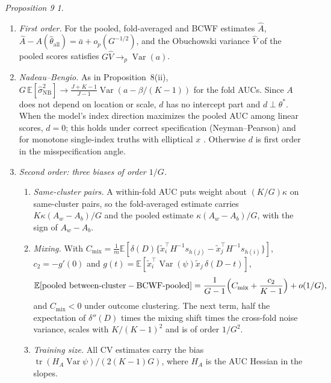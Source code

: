 \documentclass[11pt]{amsart}
\theoremstyle{plain}
\theoremstyle{definition}
\theoremstyle{remark}
\newcommand{\Var}{\operatorname{Var}}
\newcommand{\E}{\mathbb{E}}
\newcommand{\VNB}{\hat\sigma^2_{\mathrm{NB}}}
\newcommand{\fac}{\tfrac{J+K-1}{J-1}}
\newcommand{\Cmix}{C_{\mathrm{mix}}}
\newtheorem*{prop9}{Proposition 9}
\begin{document}
\begin{prop9}
\begin{enumerate}[label=(\roman*)]
\item \emph{First order.} For the pooled, fold-averaged and BCWF estimates $\hat A$, $\hat A-A(\hat\theta_{\mathrm{all}})=\bar a+o_p(G^{-1/2})$, and the Obuchowski variance $\hat V$ of the pooled scores satisfies $G\hat V\to_p\Var(a)$.
\item \emph{Nadeau--Bengio.} As in Proposition~8(ii), $G\,\E[\VNB]\to\fac\Var(a-\beta/(K-1))$ for the fold AUCs. Since $A$ does not depend on location or scale, $d$ has no intercept part and $d\perp\theta^*$. When the model's index direction maximizes the pooled AUC among linear scores, $d=0$; this holds under correct specification (Neyman--Pearson) and for monotone single-index truths with elliptical $x$ \cite{LiDuan}. Otherwise $d$ is first order in the misspecification angle.
\item \emph{Second order: three biases of order $1/G$.}
\begin{enumerate}[label=(\alph*),leftmargin=1.5em]
\item \emph{Same-cluster pairs.} A within-fold AUC puts weight about $(K/G)\kappa$ on same-cluster pairs, so the fold-averaged estimate carries $K\kappa(A_w-A_b)/G$ and the pooled estimate $\kappa(A_w-A_b)/G$, with the sign of $A_w-A_b$.
\item \emph{Mixing.} With $\Cmix=\frac1m\E[\delta(D)\{\tilde x_i^\top H^{-1}s_{h(j)}-\tilde x_j^\top H^{-1}s_{h(i)}\}]$, $c_2=-g'(0)$ and $g(t)=\E[\tilde x_i^\top\Var(\psi)\tilde x_j\,\delta(D-t)]$,
\[
\E[\text{pooled between-cluster}-\text{BCWF-pooled}]=\frac1{G-1}\Bigl(\Cmix+\frac{c_2}{K-1}\Bigr)+o(1/G),
\]
and $\Cmix<0$ under outcome clustering. The next term, half the expectation of $\delta''(D)$ times the mixing shift times the cross-fold noise variance, scales with $K/(K-1)^2$ and is of order $1/G^2$.
\item \emph{Training size.} All CV estimates carry the bias $\operatorname{tr}(H_A\Var\psi)/(2(K-1)G)$, where $H_A$ is the AUC Hessian in the slopes.
\end{enumerate}
\end{enumerate}
\end{prop9}
\end{document}
